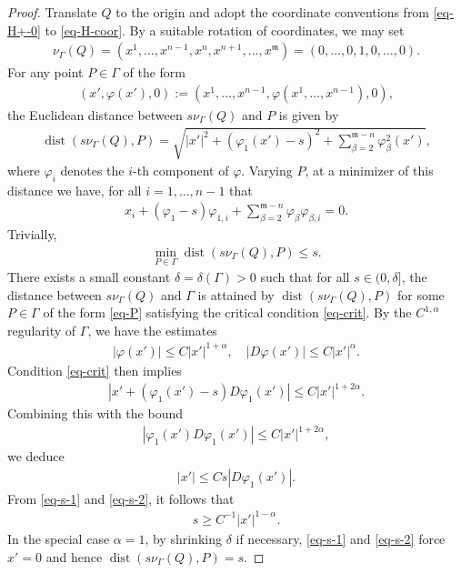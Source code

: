 \documentclass[11pt,reqno]{amsart}
\newcommand{\fm}{\mathfrak{m}}
\renewcommand{\leq}{\leqslant}
\renewcommand{\geq}{\geqslant}
\theoremstyle{definition}
\numberwithin{equation}{section}
\begin{document}
\begin{proof}
Translate $Q$ to the origin and adopt the coordinate conventions from \eqref{eq-H+-0} to \eqref{eq-H-coor}. By a suitable rotation of coordinates, we may set
\begin{align}
\nu_\Gamma(Q) = (x^1, \dots, x^{n-1}, x^n, x^{n+1}, \dots, x^\fm) = (0, \dots, 0, 1, 0, \dots, 0).
\end{align}
For any point $P\in \Gamma$ of the form
\begin{align}\label{eq-P}
(x', \varphi(x'), 0) := (x^1, \dots, x^{n-1}, \varphi (x^1, \dots, x^{n-1}), 0),
\end{align}
the Euclidean distance between $s\nu_\Gamma(Q)$ and $P$ is given by
\begin{align}
\operatorname{dist}(s\nu_\Gamma(Q), P) = \sqrt{|x'|^2 + (\varphi_1(x')-s)^2 + \sum_{\beta=2}^{\fm-n}\varphi_\beta^2(x')},
\end{align}
where $\varphi_i$ denotes the $i$-th component of $\varphi$. Varying $P$,  at a minimizer of this distance we have, for all $i=1,\dots, n-1$ that
\begin{align}\label{eq-crit}
x_i + (\varphi_1 - s)\varphi_{1, i} + \sum_{\beta=2}^{\fm-n}\varphi_\beta \varphi_{\beta,i} = 0.
\end{align}
Trivially,
\begin{align}
\min_{P\in \Gamma}\operatorname{dist}(s\nu_\Gamma(Q), P) \leq s.
\end{align}
There exists a small constant $\delta = \delta(\Gamma) > 0$ such that for all $s\in (0, \delta]$, the distance between $s\nu_\Gamma(Q)$ and $\Gamma$ is attained by $\operatorname{dist}(s\nu_\Gamma(Q), P)$ for some $P\in \Gamma$ of the form \eqref{eq-P} satisfying the critical condition \eqref{eq-crit}. By the $C^{1,\alpha}$ regularity of $\Gamma$, we have the estimates
\begin{align}\label{eq-s-1}
|\varphi(x')| \leq C|x'|^{1+\alpha}, \quad |D\varphi(x')| \leq C|x'|^{\alpha}.
\end{align}
Condition \eqref{eq-crit} then implies
\begin{align}
|x' + (\varphi_1(x') - s)D\varphi_{1}(x')| \leq C|x'|^{1+2\alpha}.
\end{align}
Combining this with the bound
\begin{align}
|\varphi_1(x') D\varphi_{1}(x')| \leq C|x'|^{1+2\alpha},
\end{align}
we deduce
\begin{align}\label{eq-s-2}
|x'| \leq C s |D\varphi_{1}(x')|.
\end{align}
From \eqref{eq-s-1} and \eqref{eq-s-2}, it follows that
\begin{align}\label{eq-s-3}
s \geq C^{-1}|x'|^{1-\alpha}.
\end{align}
In the special case $\alpha = 1$, by shrinking $\delta$ if necessary, \eqref{eq-s-1} and \eqref{eq-s-2} force $x' = 0$ and hence $\operatorname{dist}(s\nu_\Gamma(Q), P) = s$.


\end{proof}
\end{document}
